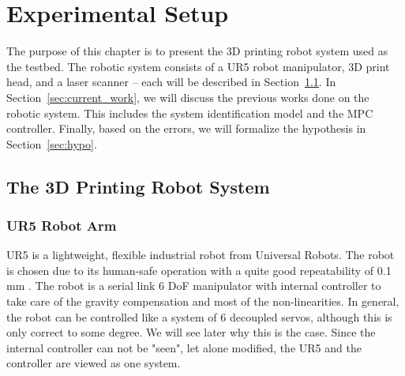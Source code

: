 \chapter{Experimental Setup} \label{chap:testbed}

The purpose of this chapter is to present the 3D printing robot system used as the testbed. The robotic system consists of a UR5 robot manipulator, 3D print head, and a laser scanner -- each will be described in Section~\ref{sec:ur5}. In Section~\ref{sec:current_work}, we will discuss the previous works done on the robotic system. This includes the system identification model and the \ac {MPC} controller. Finally, based on the errors, we will formalize the hypothesis in Section~\ref{sec:hypo}.
\section{The 3D Printing Robot System} \label{sec:ur5}
\subsection{UR5 Robot Arm} \label{subsec:ur5}
UR5 is a lightweight, flexible industrial robot from Universal Robots. The robot is chosen due to its human-safe operation with a quite good repeatability of 0.1 mm \cite{UR5}. The robot is a serial link 6 \ac{DoF} manipulator with internal controller to take care of the gravity compensation and most of the non-linearities. In general, the robot can be controlled like a system of 6 decoupled servos, although this is only correct to some degree. We will see later why this is the case. Since the internal controller can not be "seen", let alone modified, the UR5 and the controller are viewed as one system. 

